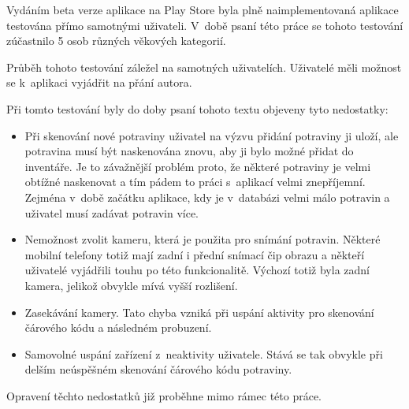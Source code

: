 \documentclass[thesis=B,czech]{FITthesis}[2013/10/20]
\begin{document}
Vydáním beta verze aplikace na Play Store byla plně naimplementovaná aplikace testována přímo samotnými uživateli. V~době psaní této práce se tohoto testování zúčastnilo 5 osob různých věkových kategorií.

Průběh tohoto testování záležel na samotných uživatelích. Uživatelé měli možnost se k~aplikaci vyjádřit na přání autora.

Při tomto testování byly do doby psaní tohoto textu objeveny tyto nedostatky:

\begin{itemize}
	\item{Při skenování nové potraviny uživatel na výzvu přidání potraviny ji uloží, ale potravina musí být naskenována znovu, aby ji bylo možné přidat do inventáře. Je to závažnější problém proto, že některé potraviny je velmi obtížné naskenovat a tím pádem to práci s~aplikací velmi znepříjemní. Zejména v~době začátku aplikace, kdy je v~databázi velmi málo potravin a uživatel musí zadávat potravin více.}
	\item{Nemožnost zvolit kameru, která je použita pro snímání potravin. Některé mobilní telefony totiž mají zadní i přední snímací čip obrazu a někteří uživatelé vyjádřili touhu po této funkcionalitě. Výchozí totiž byla zadní kamera, jelikož obvykle mívá vyšší rozlišení.}
	\item{Zasekávání kamery. Tato chyba vzniká při uspání aktivity pro skenování čárového kódu a následném probuzení.}
	\item{Samovolné uspání zařízení z~neaktivity uživatele. Stává se tak obvykle při delším neúspěšném skenování čárového kódu potraviny.}
\end{itemize}

Opravení těchto nedostatků již proběhne mimo rámec této práce.
\end{document}
